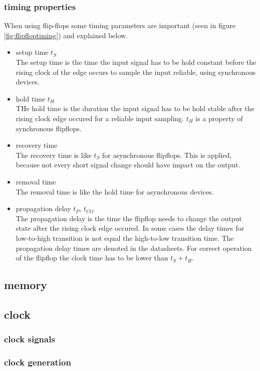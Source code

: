 \subsubsection{timing properties}
When using flip-flops some timing parameters are important (seen in figure \ref{fig:flipfloptiming}) and explained below.
\begin{itemize}
\item setup time $t_{S}$\\
The setup time is the time the input signal has to be hold constant before the rising clock of the edge occurs to sample the input reliable, using synchronous devices.
\item hold time $t_{H}$\\
THe hold time is the duration the input signal has to be hold stable after the rising clock edge occured for a reliable input sampling. $t_{H}$ is a property of synchronous flipflops.
\item recovery time\\
The recovery time is like $t_{S}$ for asynchronous flipflops. This is applied, because not every short signal change should have impact on the output. 
\item removal time\\
The removal time is like the hold time for asynchronous devices.
\item propagation delay $t_{P}$, $t_{CO}$\\
The propagation delay is the time the flipflop needs to change the output state after the rising clock edge occured. In some cases the delay times for low-to-high transition is not equal the high-to-low transition time. The propagation delay times are denoted in the datasheets. For correct operation of the flipflop the clock time has to be lower than $t_{S}+t_{H}$.
\end{itemize}
\subsection{memory}

\subsection{clock}

\subsubsection{clock signals}
\subsubsection{clock generation}
